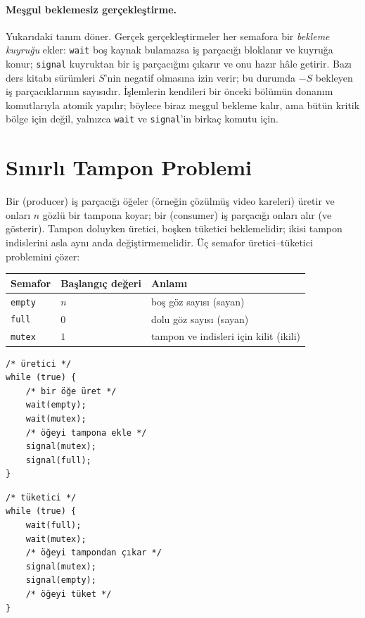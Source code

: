 \paragraph{Meşgul beklemesiz gerçekleştirme.} Yukarıdaki tanım döner. Gerçek gerçekleştirmeler her semafora bir \emph{bekleme kuyruğu} ekler: \texttt{wait} boş kaynak bulamazsa iş parçacığı bloklanır ve kuyruğa konur; \texttt{signal} kuyruktan bir iş parçacığını çıkarır ve onu hazır hâle getirir. Bazı ders kitabı sürümleri $S$'nin negatif olmasına izin verir; bu durumda $-S$ bekleyen iş parçacıklarının sayısıdır. İşlemlerin kendileri bir önceki bölümün donanım komutlarıyla atomik yapılır; böylece biraz meşgul bekleme kalır, ama bütün kritik bölge için değil, yalnızca \texttt{wait} ve \texttt{signal}'in birkaç komutu için.

\section{Sınırlı Tampon Problemi}

Bir  (producer) iş parçacığı öğeler (örneğin çözülmüş video kareleri) üretir ve onları $n$ gözlü bir tampona koyar; bir  (consumer) iş parçacığı onları alır (ve gösterir). Tampon doluyken üretici, boşken tüketici beklemelidir; ikisi tampon indislerini asla aynı anda değiştirmemelidir. Üç semafor üretici--tüketici problemini çözer:

\begin{center}
\renewcommand{\arraystretch}{1.2}
\begin{tabular}{@{}lll@{}}
\toprule
\textbf{Semafor} & \textbf{Başlangıç değeri} & \textbf{Anlamı}\\
\midrule
\texttt{empty} & $n$ & boş göz sayısı (sayan)\\
\texttt{full} & $0$ & dolu göz sayısı (sayan)\\
\texttt{mutex} & $1$ & tampon ve indisleri için kilit (ikili)\\
\bottomrule
\end{tabular}
\end{center}

\begin{center}
\begin{minipage}[t]{0.46\linewidth}
\begin{lstlisting}[numbers=none]
/* üretici */
while (true) {
    /* bir öğe üret */
    wait(empty);
    wait(mutex);
    /* öğeyi tampona ekle */
    signal(mutex);
    signal(full);
}
\end{lstlisting}
\end{minipage}\hfill
\begin{minipage}[t]{0.46\linewidth}
\begin{lstlisting}[numbers=none]
/* tüketici */
while (true) {
    wait(full);
    wait(mutex);
    /* öğeyi tampondan çıkar */
    signal(mutex);
    signal(empty);
    /* öğeyi tüket */
}
\end{lstlisting}
\end{minipage}
\end{center}

